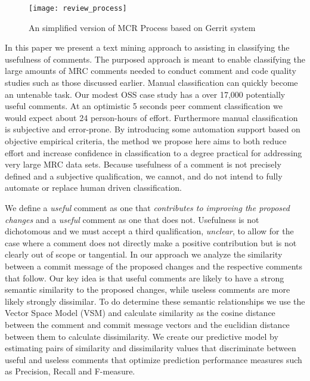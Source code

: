 \begin{figure}[!t]
\centering
\texttt{[image: review\_process]}
\caption{An simplified version of MCR Process based on Gerrit system}
\label{fig:process}
\end{figure}

In this paper we present a text mining approach to assisting in classifying the usefulness of comments. The purposed approach is meant to enable classifying the large amounts of MRC comments needed to conduct comment and code quality studies such as those discussed earlier. Manual classification can quickly become an untenable task. Our modest OSS case study has a over 17,000 potentially useful comments. At an optimistic 5 seconds peer comment classification we would expect about 24 person-hours of effort. Furthermore manual classification is subjective and error-prone. By introducing some automation support based on objective empirical criteria, the method we propose here aims to both reduce effort and increase confidence in classification to a degree practical for addressing very large MRC data sets. Because usefulness of a comment is not precisely defined and a subjective qualification, we cannot, and do not intend to fully automate or replace human driven classification.  

We define a \emph{useful} comment as one that \emph{contributes to improving the proposed changes} and a \emph{useful} comment as one that does not. Usefulness is not dichotomous and we must accept a third qualification, \emph{unclear}, to allow for the case where a comment does not directly make a positive contribution but is not clearly out of scope or tangential. In our approach we analyze the similarity between a commit message of the proposed changes and the respective comments that follow. Our key idea is that useful comments are likely to have a strong semantic similarity to the proposed changes, while useless comments are more likely strongly dissimilar. To do determine these semantic relationships we use the Vector Space Model (VSM) and calculate similarity as the cosine distance between the comment and commit message vectors and the euclidian distance between them to calculate dissimilarity. 
We create our predictive model by estimating pairs of similarity and dissimilarity values that discriminate between useful and useless comments that optimize prediction performance measures such as Precision, Recall and F-measure.

